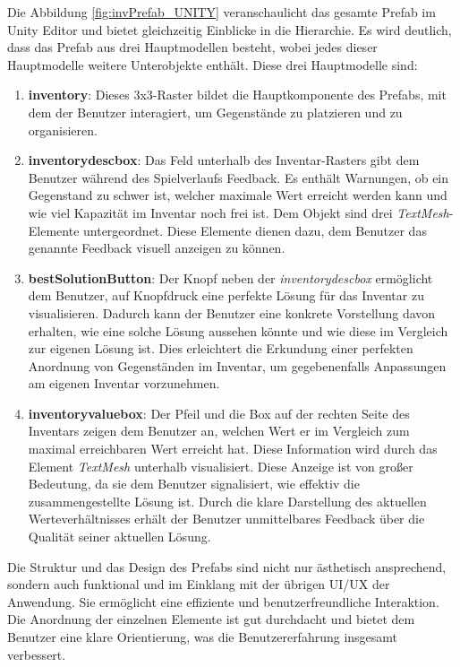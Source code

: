 Die Abbildung \ref{fig:invPrefab_UNITY} veranschaulicht das gesamte Prefab im Unity Editor und bietet gleichzeitig Einblicke
in die Hierarchie. Es wird deutlich, dass das Prefab aus drei Hauptmodellen besteht, wobei jedes dieser Hauptmodelle weitere
Unterobjekte enthält. Diese drei Hauptmodelle sind:
\begin{enumerate}
    \item \textbf{inventory}: Dieses 3x3-Raster bildet die Hauptkomponente des Prefabs, mit dem der Benutzer interagiert, um
    Gegenstände zu platzieren und zu organisieren.

    \item \textbf{inventorydescbox}: Das Feld unterhalb des Inventar-Rasters gibt dem Benutzer während des Spielverlaufs Feedback.
    Es enthält Warnungen, ob ein Gegenstand zu schwer ist, welcher maximale Wert erreicht werden kann und wie viel Kapazität
    im Inventar noch frei ist. Dem Objekt sind drei \textit{TextMesh}-Elemente untergeordnet. Diese Elemente dienen dazu,
    dem Benutzer das genannte Feedback visuell anzeigen zu können.

    \item \textbf{bestSolutionButton}: Der Knopf neben der \textit{inventorydescbox} ermöglicht dem Benutzer, auf Knopfdruck
    eine perfekte Lösung für das Inventar zu visualisieren. Dadurch kann der Benutzer eine konkrete Vorstellung davon erhalten,
    wie eine solche Lösung aussehen könnte und wie diese im Vergleich zur eigenen Lösung ist. Dies erleichtert die Erkundung
    einer perfekten Anordnung von Gegenständen im Inventar, um gegebenenfalls Anpassungen am eigenen Inventar vorzunehmen.

    \item \textbf{inventoryvaluebox}: Der Pfeil und die Box auf der rechten Seite des Inventars zeigen dem Benutzer an, welchen
    Wert er im Vergleich zum maximal erreichbaren Wert erreicht hat. Diese Information wird durch das Element \textit{TextMesh}
    unterhalb visualisiert. Diese Anzeige ist von großer Bedeutung, da sie dem Benutzer signalisiert, wie effektiv die
    zusammengestellte Lösung ist. Durch die klare Darstellung des aktuellen Werteverhältnisses erhält der Benutzer unmittelbares
    Feedback über die Qualität seiner aktuellen Lösung.
\end{enumerate}

Die Struktur und das Design des Prefabs sind nicht nur ästhetisch ansprechend, sondern auch funktional und im Einklang
mit der übrigen UI/UX der Anwendung. Sie ermöglicht eine effiziente und benutzerfreundliche Interaktion. Die Anordnung
der einzelnen Elemente ist gut durchdacht und bietet dem Benutzer eine klare Orientierung, was die Benutzererfahrung
insgesamt verbessert.

